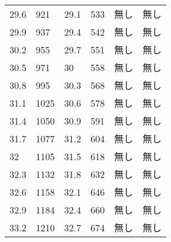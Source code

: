 \documentclass{jsarticle}
\begin{document}
\begin{longtable}[h]
\begin{longtable}{llllll}
29.6                     & 921                     & 29.1                    & 533                     & 無し                      & 無し                      \\
29.9                     & 937                     & 29.4                    & 542                     & 無し                      & 無し                      \\
30.2                     & 955                     & 29.7                    & 551                     & 無し                      & 無し                      \\
30.5                     & 971                     & 30                      & 558                     & 無し                      & 無し                      \\
30.8                     & 995                     & 30.3                    & 568                     & 無し                      & 無し                      \\
31.1                     & 1025                    & 30.6                    & 578                     & 無し                      & 無し                      \\
31.4                     & 1050                    & 30.9                    & 591                     & 無し                      & 無し                      \\
31.7                     & 1077                    & 31.2                    & 604                     & 無し                      & 無し                      \\
32                       & 1105                    & 31.5                    & 618                     & 無し                      & 無し                      \\
32.3                     & 1132                    & 31.8                    & 632                     & 無し                      & 無し                      \\
32.6                     & 1158                    & 32.1                    & 646                     & 無し                      & 無し                      \\
32.9                     & 1184                    & 32.4                    & 660                     & 無し                      & 無し                      \\
33.2                     & 1210                    & 32.7                    & 674                     & 無し                      & 無し                      \\

\end{longtable}
\end{longtable}
\end{document}
